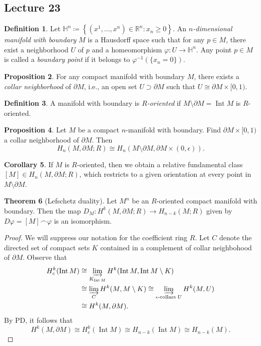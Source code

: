 \documentclass[10pt,letterpaper,cm]{nupset}
\theoremstyle{definition}
\newtheorem{definition}{Definition}[subsection]
\theoremstyle{theorem}
\newtheorem{theorem}[definition]{Theorem}
\newtheorem{prop}[definition]{Proposition}
\newtheorem{corollary}[definition]{Corollary}
\theoremstyle{remark}
\renewcommand{\H}{\mathbb H}
\newcommand{\R}{\mathbb{R}}
\newcommand{\1}{\mathbb{1}}
\newcommand{\0}{\vec 0}
\DeclareMathOperator{\Int}{Int}
\begin{document}
\subsection{Lecture 23}

\begin{definition}
Let $\H^n\coloneqq  \left\{(x^1, \ldots, x^n) \in \R^n : x_n \geq 0\right\}.$ An \textit{$n$-dimensional manifold with boundary} $M$ is a Hausdorff space such that for any $p \in M$, there exist a neighborhood $U$ of $p$ and a homeomorphism $\varphi : U \to \H^n$.  Any point $p\in M$ is called a \textit{boundary point} if it belongs to $\varphi^{-1}( \{x_n = 0\})$.
\end{definition}

\begin{prop} 
For any compact manifold with boundary $M$, there exists a \textit{collar neighborhood} of $\partial{M}$, i.e., an open set $U\supset \partial{M}$ such that $U \cong \partial{M} \times [0,1)$.
\end{prop}

\begin{definition}
A manifold with boundary is \textit{$R$-oriented} if $M \setminus \partial{M} = \Int{M}$ is $R$-oriented.
\end{definition}

\begin{prop} 
Let $M$ be a compact $n$-manifold with boundary. Find $ \partial{M} \times [0,1)$ a collar neighborhood of $\partial{M}$. Then $$  H_n(M, \partial{M}; R) \cong H_n(M \setminus \partial{M}, \partial{M} \times (0, \epsilon))  .$$
\end{prop}

\begin{corollary}
If $M$ is $R$-oriented, then we obtain a relative fundamental class $[M] \in H_n(M, \partial{M}; R)$, which restricts to a given orientation at every point in $M \setminus \partial{M}$.
\end{corollary}

\begin{theorem}[Lefschetz duality]
Let $M^n$ be an $R$-oriented compact manifold with boundary. Then the map $D_M: H^k(M, \partial{M}; R) \to H_{n-k}(M; R)$ given by $D{\varphi} = [M] \frown \varphi$ is an isomorphism. 
\end{theorem}
\begin{proof}
We will suppress our notation for the coefficient ring $R$. Let $C$ denote the directed set of compact sets $K$ contained in a complement of collar neighbohood of $\partial{M}$. Observe that
\begin{align*}
H^k_c(\Int{M}) & \cong \varinjlim_{K_{\Int{M}}} H^k(\Int{M}, \Int{M} \setminus K)
\\ & \cong \varinjlim_{C} H^k(M, M \setminus K) \cong \varinjlim_{\epsilon{\text{-collars }}U} H^k(M, U)
\\ & \cong H^k(M, \partial{M}). 
\end{align*}
By PD, it follows that $$H^k(M, \partial{M}) \cong H^k_c(\Int{M}) \cong H_{n-k}(\Int{M}) \cong H_{n-k}(M)  .$$
\end{proof}
\end{document}
